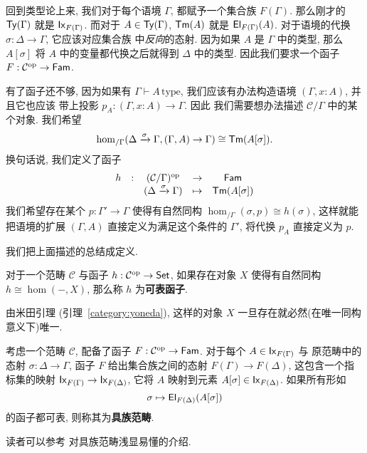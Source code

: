 回到类型论上来, 我们对于每个语境 \(\Gamma\),
都赋予一个集合族 \(F(\Gamma)\).
那么刚才的 \(\textnormal{\textsf{Ty}}(\Gamma)\) 就是
\(\textnormal{\textsf{Ix}}_{F(\Gamma)}\). 而对于
\(A \in \textnormal{\textsf{Ty}}(\Gamma)\), \(\textnormal{\textsf{Tm}}(A)\)
就是 \(\textnormal{\textsf{El}}_{F(\Gamma)}(A)\).
对于语境的代换 \(\sigma : \Delta\to\Gamma\), 它应该对应集合族
中\emph{反向}的态射. 因为如果 \(A\) 是 \(\Gamma\) 中的类型,
那么 \(A[\sigma]\) 将 \(A\) 中的变量都代换之后就得到 \(\Delta\)
中的类型. 因此我们要求一个函子
\(F : \mathcal C^\mathrm{op} \to \textnormal{\textsf{Fam}}\).

有了函子还不够, 因为如果有 \(\Gamma \vdash A\,\text{type}\),
我们应该有办法构造语境 \((\Gamma, x{:}A)\), 并且它也应该
带上投影 \(p_A : (\Gamma,x{:}A) \to \Gamma\). 因此
我们需要想办法描述 \(\mathcal C/\Gamma\) 中的某个对象.
我们希望
\[\hom_{/\Gamma}(\Delta \xrightarrow\sigma \Gamma,
(\Gamma,A) \to \Gamma)
\cong \textnormal{\textsf{Tm}}(A[\sigma]).\]
换句话说, 我们定义了函子
\[\begin{matrix}
h &:& (\mathcal C/\Gamma)^{\textrm{op}} &\to& \textnormal{\textsf{Fam}}\\
& & (\Delta \xrightarrow\sigma \Gamma) &\mapsto& \textnormal{\textsf{Tm}}(A[\sigma])
\end{matrix}\]
我们希望存在某个 \(p : \Gamma'\to \Gamma\) 使得有自然同构
\(\hom_{/\Gamma}(\sigma, p) \cong h(\sigma)\),
这样就能把语境的扩展 \((\Gamma, A)\) 直接定义为满足这个条件的
\(\Gamma'\), 将代换 \(p_A\) 直接定义为 \(p\).

我们把上面描述的总结成定义.
\begin{definition}
对于一个范畴 \(\mathcal C\) 与函子 \(h : \mathcal C^{\textrm{op}} \to \textnormal{\textsf{Set}}\),
如果存在对象 \(X\) 使得有自然同构 \(h \cong \hom(-,X)\),
那么称 \(h\) 为\textbf{可表函子}.
\end{definition}
由米田引理 (引理~\ref{category:yoneda}), 这样的对象 \(X\)
一旦存在就必然(在唯一同构意义下)唯一.
\begin{definition}
考虑一个范畴 \(\mathcal C\), 配备了函子
\(F : \mathcal C^{\textrm{op}} \to \textnormal{\textsf{Fam}}\).
对于每个 \(A \in \textnormal{\textsf{Ix}}_{F(\Gamma)}\) 与
原范畴中的态射 \(\sigma : \Delta\to\Gamma\),
函子 \(F\) 给出集合族之间的态射 \(F(\Gamma) \to F(\Delta)\),
这包含一个指标集的映射 \(\textnormal{\textsf{Ix}}_{F(\Gamma)} \to \textnormal{\textsf{Ix}}_{F(\Delta)}\),
它将 \(A\) 映射到元素 \(A[\sigma] \in \textnormal{\textsf{Ix}}_{F(\Delta)}\).
如果所有形如
\[\sigma \mapsto \textnormal{\textsf{El}}_{F(\Delta)}(A[\sigma])\]
的函子都可表, 则称其为\textbf{具族范畴}.
\end{definition}

读者可以参考 \cite{castellan:2019:cwf} 对具族范畴浅显易懂的介绍.


